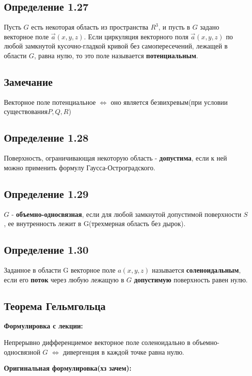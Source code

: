 \documentclass[12pt, english]{article}
\begin{document}
\subsection{Определение 1.27}
Пусть $G$ есть некоторая область из пространства $R^3$, и пусть в $G$ задано
векторное поле $\vec{a}(x, y, z).$
Если циркуляция векторного поля $\vec{a}(x, y, z)$ по любой замкнутой кусочно-гладкой кривой без самопересечений, лежащей в области $G$, равна нулю, то это поле называется \textbf{потенциальным}.

\subsection{Замечание}
	Векторное поле потенциальное $\Leftrightarrow$ оно является безвихревым(при условии существования$ P, Q, R$)
	
	
\subsection{Определение 1.28}	
	Поверхность, ограничивающая некоторую область - \textbf{допустима}, если к ней можно применить формулу Гаусса-Остроградского.
	
\subsection{Определение 1.29}
	$G$ - \textbf{объемно-односвязная}, если для любой замкнутой допустимой поверхности $S$, ее внутренность лежит в G(трехмерная область без дырок).
	
\subsection{Определение 1.30}
Заданное в области G векторное поле $a(x, y, z)$ называется \textbf{соленоидальным}, если его \textbf{поток} через любую лежащую в $G$ \textbf{допустимую} поверхность равен нулю.	
	
\subsection{Теорема	Гельмгольца}
	\par \textbf{Формулировка с лекции:}
	
		Непрерывно дифференциемое векторное поле соленоидально в объемно-односвязной $G$ $\Leftrightarrow$ дивергенция в каждой точке 		равна нулю.
	
	\par \textbf{Оригинальная формулировка(хз зачем):}
	
\end{document}
